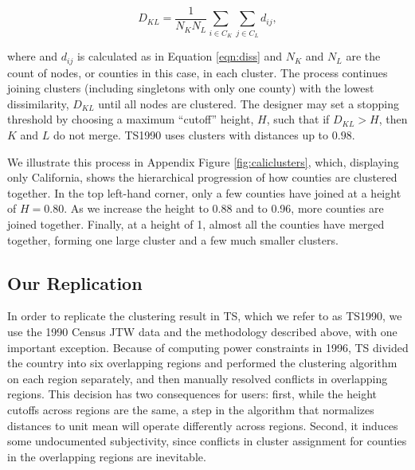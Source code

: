 \begin{equation}\label{eqn:diss_cluster}
D_{KL} = \frac{1}{N_K N_L} \sum_{i \in C_K} \sum_{j \in C_L} d_{ij},
\end{equation}

where and $d_{ij}$ is calculated as in Equation \ref{eqn:diss} and $N_K$ and $N_L$ are the count of nodes, or counties in this case, in each cluster. The process continues joining clusters (including singletons with only one county) with the lowest dissimilarity, $D_{KL}$ until all nodes are clustered. The designer may set a stopping threshold by choosing a maximum ``cutoff'' height, $H$, such that if $D_{KL}>H$, then $K$ and $L$ do not merge. TS1990 uses clusters with distances up to $0.98$.

We illustrate this process in Appendix Figure \ref{fig:caliclusters}, which, displaying only California, shows the hierarchical progression of how counties are clustered together. In the top left-hand corner, only a few counties have joined at a height of $H=0.80$. As we increase the height to 0.88 and to 0.96, more counties are joined together. Finally, at a height of 1, almost all the counties have merged together, forming one large cluster and a few much smaller clusters.

\subsection{Our Replication}
\FloatBarrier

In order to replicate the clustering result in TS, which we refer to as TS1990, we use the 1990 Census JTW data and the methodology described above, with one important exception. Because of computing power constraints in 1996, TS divided the country into six overlapping regions and performed the clustering algorithm on each region separately, and then manually resolved conflicts in overlapping regions. This decision has two consequences for users: first, while the height cutoffs across regions are the same, a step in the algorithm that normalizes distances to unit mean will operate differently across regions. Second, it induces some undocumented subjectivity, since conflicts in cluster assignment for counties in the overlapping regions are inevitable.

